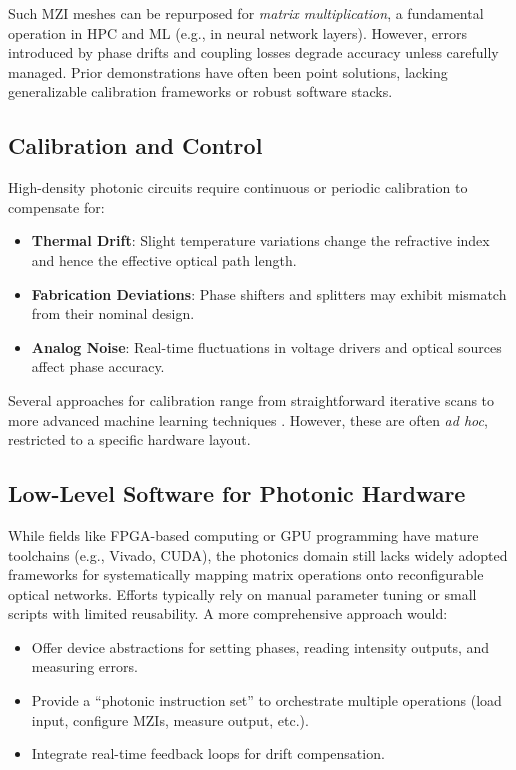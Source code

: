 \documentclass[conference]{IEEEtran}
\begin{document}
Such MZI meshes can be repurposed for \emph{matrix multiplication}, a fundamental operation in HPC and ML (e.g., in neural network layers). However, errors introduced by phase drifts and coupling losses degrade accuracy unless carefully managed. Prior demonstrations have often been point solutions, lacking generalizable calibration frameworks or robust software stacks.

\subsection{Calibration and Control}
High-density photonic circuits require continuous or periodic calibration to compensate for:
\begin{itemize}
    \item \textbf{Thermal Drift}: Slight temperature variations change the refractive index and hence the effective optical path length.
    \item \textbf{Fabrication Deviations}: Phase shifters and splitters may exhibit mismatch from their nominal design.
    \item \textbf{Analog Noise}: Real-time fluctuations in voltage drivers and optical sources affect phase accuracy.
\end{itemize}
Several approaches for calibration range from straightforward iterative scans \cite{shen2017deep} to more advanced machine learning techniques \cite{harris2018linear}. However, these are often \emph{ad hoc}, restricted to a specific hardware layout.

\subsection{Low-Level Software for Photonic Hardware}
While fields like FPGA-based computing or GPU programming have mature toolchains (e.g., Vivado, CUDA), the photonics domain still lacks widely adopted frameworks for systematically mapping matrix operations onto reconfigurable optical networks. Efforts typically rely on manual parameter tuning or small scripts with limited reusability. A more comprehensive approach would:
\begin{itemize}
    \item Offer device abstractions for setting phases, reading intensity outputs, and measuring errors.
    \item Provide a “photonic instruction set” to orchestrate multiple operations (load input, configure MZIs, measure output, etc.).
    \item Integrate real-time feedback loops for drift compensation.
\end{itemize}
\end{document}
